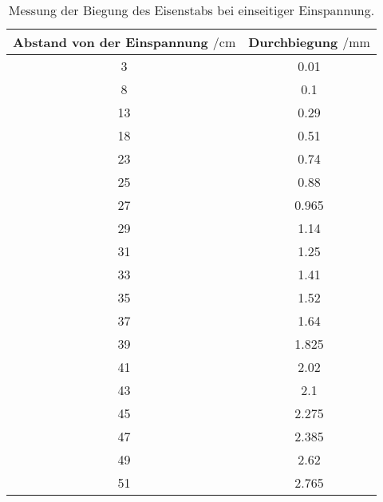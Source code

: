   \begin{table}
    \centering
    \caption{Messung der Biegung des Eisenstabs bei einseitiger Einspannung.}
    \label{tab:rund}
    \begin{tabular}{c c}
      \toprule
      Abstand von der Einspannung $\mathbin{/} \si{\centi\m}$ & Durchbiegung $\mathbin{/} \si{\milli\m}$\\
      \midrule
      3  & 0.01\\
      8  & 0.1\\
      13 & 0.29\\
      18 & 0.51\\
      23 & 0.74\\
      25 & 0.88\\
      27 & 0.965\\
      29 & 1.14\\
      31 & 1.25\\
      33 & 1.41\\
      35 & 1.52\\
      37 & 1.64\\
      39 & 1.825\\
      41 & 2.02\\
      43 & 2.1\\
      45 & 2.275\\
      47 & 2.385\\
      49 & 2.62\\
      51 & 2.765\\
      \bottomrule
    \end{tabular}
  \end{table}
  \FloatBarrier

